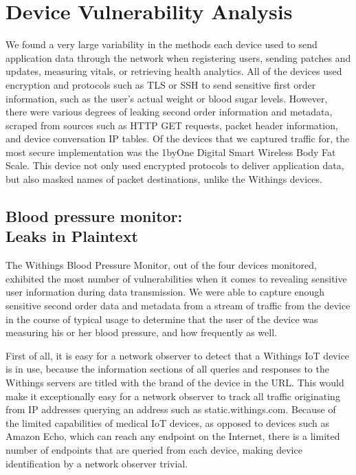 \section{Device Vulnerability Analysis}

We found a very large variability in the methods each device used to send application data through the network when registering users, sending patches and updates, measuring vitals, or retrieving health analytics. All of the devices used encryption and protocols such as TLS or SSH to send sensitive first order information, such as the user's actual weight or blood sugar levels. However, there were various degrees of leaking second order information and metadata, scraped from sources such as HTTP GET requests, packet header information, and device conversation IP tables. Of the devices that we captured traffic for, the most secure implementation was the 1byOne Digital Smart Wireless Body Fat Scale. This device not only used encrypted protocols to deliver application data, but also masked names of packet destinations, unlike the Withings devices. 

\subsection{Blood pressure monitor: \\ Leaks in Plaintext}

The Withings Blood Pressure Monitor, out of the four devices monitored, exhibited the most number of vulnerabilities when it comes to revealing sensitive user information during data transmission. We were able to capture enough sensitive second order data and metadata from a stream of traffic from the device in the course of typical usage to determine that the user of the device was measuring his or her blood pressure, and how frequently as well. 

First of all, it is easy for a network observer to detect that a Withings IoT device is in use, because the information sections of all queries and responses to the Withings servers are titled with the brand of the device in the URL. This would make it exceptionally easy for a network observer to track all traffic originating from IP addresses querying an address such as static.withings.com. Because of the limited capabilities of medical IoT devices, as opposed to devices such as Amazon Echo, which can reach any endpoint on the Internet, there is a limited number of endpoints that are queried from each device, making device identification by a network observer trivial.

